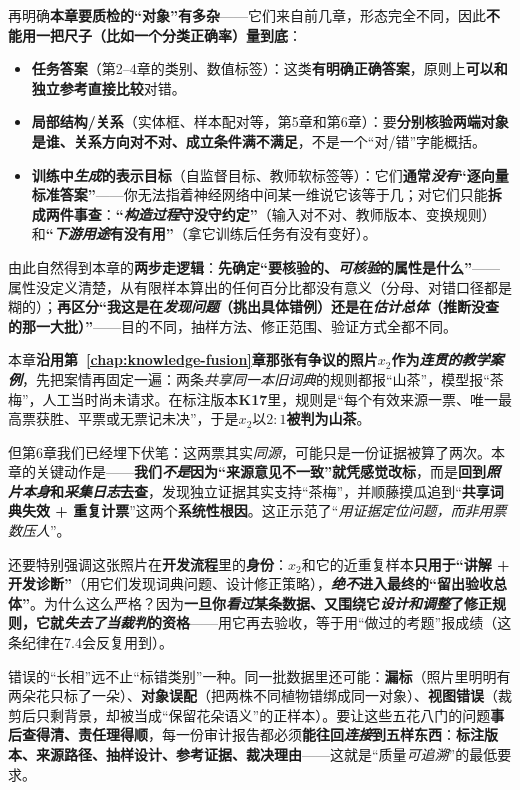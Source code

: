 再明确\textbf{本章要质检的“对象”有多杂}——它们来自前几章，形态完全不同，因此\textbf{不能用一把尺子（比如一个分类正确率）量到底}：
\begin{itemize}\item \textbf{任务答案}（第2–4章的类别、数值标签）：这类\textbf{有明确正确答案}，原则上\textbf{可以和独立参考直接比较}对错。\item \textbf{局部结构/关系}（实体框、样本配对等，第5章和第6章）：要\textbf{分别核验两端对象是谁、关系方向对不对、成立条件满不满足}，不是一个“对/错”字能概括。\item \textbf{训练中\emph{生成}的表示目标}（自监督目标、教师软标签等）：它们\textbf{通常\emph{没有}“逐向量标准答案”}——你无法指着神经网络中间某一维说它该等于几；对它们只能\textbf{拆成两件事查}：\textbf{“\emph{构造过程}守没守约定”}（输入对不对、教师版本、变换规则）和\textbf{“\emph{下游用途}有没有用”}（拿它训练后任务有没有变好）。\end{itemize}
由此自然得到本章的\textbf{两步走逻辑}：\textbf{先确定“要核验的、\emph{可核验}的属性是什么”}——属性没定义清楚，从有限样本算出的任何百分比都没有意义（分母、对错口径都是糊的）；\textbf{再区分“我这是在\emph{发现问题}（挑出具体错例）还是在\emph{估计总体}（推断没查的那一大批）”}——目的不同，抽样方法、修正范围、验证方式全都不同。

本章\textbf{沿用第~\ref{chap:knowledge-fusion}章那张有争议的照片$x_2$作为\emph{连贯的教学案例}}，先把案情再固定一遍：两条\emph{共享同一本旧词典}的规则都报“山茶”，模型报“茶梅”，人工当时尚未请求。在标注版本\textbf{K17}里，规则是“每个有效来源一票、唯一最高票获胜、平票或无票记未决”，于是$x_2$以\textbf{$2:1$被判为山茶}。

但第6章我们已经埋下伏笔：这两票其实\emph{同源}，可能只是一份证据被算了两次。本章的关键动作是——\textbf{我们\emph{不是}因为“来源意见不一致”就凭感觉改标}，而是\textbf{回到\emph{照片本身}和\emph{采集日志}去查}，发现独立证据其实支持“茶梅”，并顺藤摸瓜追到“\textbf{共享词典失效 + 重复计票}”这两个\textbf{系统性根因}。这正示范了“\emph{用证据定位问题，而非用票数压人}”。

还要特别强调这张照片在\textbf{开发流程}里的\textbf{身份}：$x_2$和它的近重复样本\textbf{只用于“讲解 + 开发诊断”}（用它们发现词典问题、设计修正策略），\textbf{\emph{绝不}进入最终的“留出验收总体”}。为什么这么严格？因为\textbf{一旦你\emph{看过}某条数据、又围绕它\emph{设计和调整}了修正规则，它就\emph{失去了当裁判}的资格}——用它再去验收，等于用“做过的考题”报成绩（这条纪律在7.4会反复用到）。

错误的“长相”远不止“标错类别”一种。同一批数据里还可能：\textbf{漏标}（照片里明明有两朵花只标了一朵）、\textbf{对象误配}（把两株不同植物错绑成同一对象）、\textbf{视图错误}（裁剪后只剩背景，却被当成“保留花朵语义”的正样本）。要让这些五花八门的问题\textbf{事后查得清、责任理得顺}，每一份审计报告都必须\textbf{能往回\emph{连接}到五样东西}：\textbf{标注版本、来源路径、抽样设计、参考证据、裁决理由}——这就是“质量\emph{可追溯}”的最低要求。

